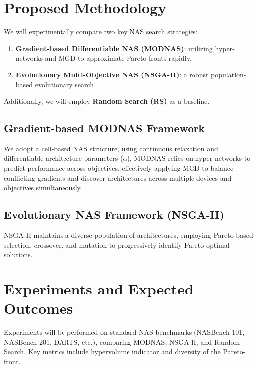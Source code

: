 \documentclass[11pt,a4paper]{article}
\begin{document}
	\section{Proposed Methodology}
	
	We will experimentally compare two key NAS search strategies:
	
	\begin{enumerate}
		\item \textbf{Gradient-based Differentiable NAS (MODNAS)}: utilizing hyper-networks and MGD to approximate Pareto fronts rapidly.
		\item \textbf{Evolutionary Multi-Objective NAS (NSGA-II)}: a robust population-based evolutionary search.
	\end{enumerate}
	
	Additionally, we will employ \textbf{Random Search (RS)} as a baseline.
	
	\subsection{Gradient-based MODNAS Framework}
	
	We adopt a cell-based NAS structure, using continuous relaxation and differentiable architecture parameters ($\alpha$). MODNAS relies on hyper-networks to predict performance across objectives, effectively applying MGD to balance conflicting gradients and discover architectures across multiple devices and objectives simultaneously.
	
	\subsection{Evolutionary NAS Framework (NSGA-II)}
	
	NSGA-II maintains a diverse population of architectures, employing Pareto-based selection, crossover, and mutation to progressively identify Pareto-optimal solutions.
	
	
	\section{Experiments and Expected Outcomes}
	
	Experiments will be performed on standard NAS benchmarks (NASBench-101, NASBench-201, DARTS, etc.), comparing MODNAS, NSGA-II, and Random Search. Key metrics include hypervolume indicator and diversity of the Pareto-front.
	
\end{document}
